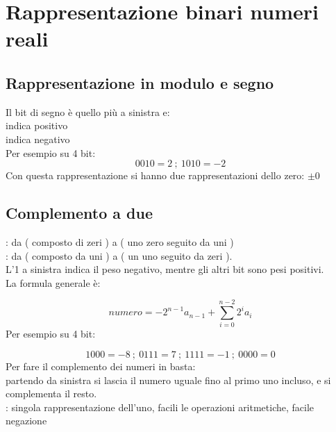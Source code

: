 \documentclass[arch.tex]{subfiles}
\begin{document}
\section{Rappresentazione binari numeri reali}

\subsection{Rappresentazione in modulo e segno}%
\label{sub:rappresentazione_in_modulo_e_segno}
Il bit di segno è quello più a sinistra e:\\
 indica positivo\\
 indica negativo\\
Per esempio su 4 bit:
\begin{equation}
	0010 = 2\ ;\ 1010 = -2
\end{equation}
Con questa rappresentazione si hanno due rappresentazioni dello zero: $ \pm 0 $ 

\subsection{Complemento a due}%
\label{sub:complemento_a_due}
: da  ( composto di  zeri ) a  
( uno zero seguito da  uni )\\
: da  ( composto da  uni ) a  
( un uno seguito da  zeri ).\\
L'1 a sinistra indica il peso negativo, mentre gli altri bit sono pesi positivi.\\
La formula generale è:

\begin{equation}
	numero = -2^{n-1} a_{n-1} + \sum_{i=0}^{n - 2} 2^i a_i
\end{equation}
Per esempio su 4 bit:

\begin{equation}
	1000 = -8\ ;\ 0111 = 7\ ;\ 1111 = -1\ ;\ 0000 = 0
\end{equation}
Per fare il complemento dei numeri in basta:\\
partendo da sinistra si lascia il numero uguale fino al primo uno incluso, e si 
complementa il resto.\\
: singola rappresentazione dell'uno, facili le 
operazioni aritmetiche, facile negazione


\end{document}
